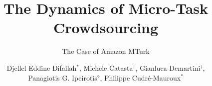 \documentclass{sig-alternate}
\begin{document}
%

\title{The Dynamics of Micro-Task Crowdsourcing}
\subtitle{The Case of Amazon MTurk}


\author{
\alignauthor
Djellel Eddine Difallah$^*$, Michele Catasta$^\dagger$, Gianluca Demartini$^\ddagger$, \\  Panagiotis G. Ipeirotis$^\diamond$, Philippe Cudr\'e-Mauroux$^*$\\
       \\
       \\
       \\
}
\end{document}
